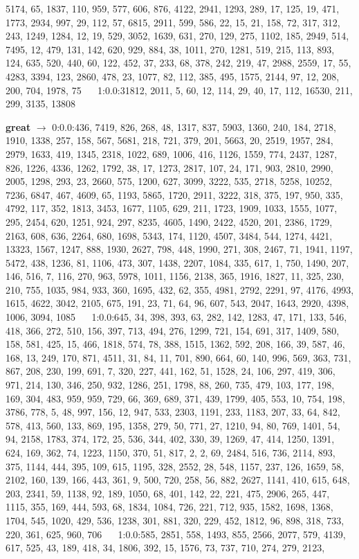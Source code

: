 \documentclass[a4paper,11pt,oneside]{book}
\begin{document}
5174, 65, 1837, 110, 959, 577, 606, 876, 4122, 2941, 1293, 289, 17, 125, 19, 471, 1773, 2934, 997, 29, 112, 57, 6815, 2911, 599, 586, 22, 15, 21, 158, 72, 317, 312, 243, 1249, 1284, 12, 19, 529, 3052, 1639, 631, 270, 129, 275, 1102, 185, 2949, 514, 7495, 12, 479, 131, 142, 620, 929, 884, 38, 1011, 270, 1281, 519, 215, 113, 893, 124, 635, 520, 440, 60, 122, 452, 37, 233, 68, 378, 242, 219, 47, 2988, 2559, 17, 55, 4283, 3394, 123, 2860, 478, 23, 1077, 82, 112, 385, 495, 1575, 2144, 97, 12, 208, 200, 704, 1978, 75	$\quad$	1:0.0:31812, 2011, 5, 60, 12, 114, 29, 40, 17, 112, 16530, 211, 299, 3135, 13808	$\quad$	

\textbf{great} $\rightarrow$	0:0.0:436, 7419, 826, 268, 48, 1317, 837, 5903, 1360, 240, 184, 2718, 1910, 1338, 257, 158, 567, 5681, 218, 721, 379, 201, 5663, 20, 2519, 1957, 284, 2979, 1633, 419, 1345, 2318, 1022, 689, 1006, 416, 1126, 1559, 774, 2437, 1287, 826, 1226, 4336, 1262, 1792, 38, 17, 1273, 2817, 107, 24, 171, 903, 2810, 2990, 2005, 1298, 293, 23, 2660, 575, 1200, 627, 3099, 3222, 535, 2718, 5258, 10252, 7236, 6847, 467, 4609, 65, 1193, 5865, 1720, 2911, 3222, 318, 375, 197, 950, 335, 4792, 117, 352, 1813, 3453, 1677, 1105, 629, 211, 1723, 1909, 1033, 1555, 1077, 295, 2454, 620, 1251, 924, 297, 8235, 4605, 1490, 2422, 4520, 201, 2386, 1729, 2163, 608, 636, 2264, 680, 1698, 5343, 174, 1120, 4507, 3484, 544, 1274, 4421, 13323, 1567, 1247, 888, 1930, 2627, 798, 448, 1990, 271, 308, 2467, 71, 1941, 1197, 5472, 438, 1236, 81, 1106, 473, 307, 1438, 2207, 1084, 335, 617, 1, 750, 1490, 207, 146, 516, 7, 116, 270, 963, 5978, 1011, 1156, 2138, 365, 1916, 1827, 11, 325, 230, 210, 755, 1035, 984, 933, 360, 1695, 432, 62, 355, 4981, 2792, 2291, 97, 4176, 4993, 1615, 4622, 3042, 2105, 675, 191, 23, 71, 64, 96, 607, 543, 2047, 1643, 2920, 4398, 1006, 3094, 1085	$\quad$	1:0.0:645, 34, 398, 393, 63, 282, 142, 1283, 47, 171, 133, 546, 418, 366, 272, 510, 156, 397, 713, 494, 276, 1299, 721, 154, 691, 317, 1409, 580, 158, 581, 425, 15, 466, 1818, 574, 78, 388, 1515, 1362, 592, 208, 166, 39, 587, 46, 168, 13, 249, 170, 871, 4511, 31, 84, 11, 701, 890, 664, 60, 140, 996, 569, 363, 731, 867, 208, 230, 199, 691, 7, 320, 227, 441, 162, 51, 1528, 24, 106, 297, 419, 306, 971, 214, 130, 346, 250, 932, 1286, 251, 1798, 88, 260, 735, 479, 103, 177, 198, 169, 304, 483, 959, 959, 729, 66, 369, 689, 371, 439, 1799, 405, 553, 10, 754, 198, 3786, 778, 5, 48, 997, 156, 12, 947, 533, 2303, 1191, 233, 1183, 207, 33, 64, 842, 578, 413, 560, 133, 869, 195, 1358, 279, 50, 771, 27, 1210, 94, 80, 769, 1401, 54, 94, 2158, 1783, 374, 172, 25, 536, 344, 402, 330, 39, 1269, 47, 414, 1250, 1391, 624, 169, 362, 74, 1223, 1150, 370, 51, 817, 2, 2, 69, 2484, 516, 736, 2114, 893, 375, 1144, 444, 395, 109, 615, 1195, 328, 2552, 28, 548, 1157, 237, 126, 1659, 58, 2102, 160, 139, 166, 443, 361, 9, 500, 720, 258, 56, 882, 2627, 1141, 410, 615, 648, 203, 2341, 59, 1138, 92, 189, 1050, 68, 401, 142, 22, 221, 475, 2906, 265, 447, 1115, 355, 169, 444, 593, 68, 1834, 1084, 726, 221, 712, 935, 1582, 1698, 1368, 1704, 545, 1020, 429, 536, 1238, 301, 881, 320, 229, 452, 1812, 96, 898, 318, 733, 220, 361, 625, 960, 706	$\quad$	1:0.0:585, 2851, 558, 1493, 855, 2566, 2077, 579, 4139, 617, 525, 43, 189, 418, 34, 1806, 392, 15, 1576, 73, 737, 710, 274, 279, 2123, 
\end{document}

